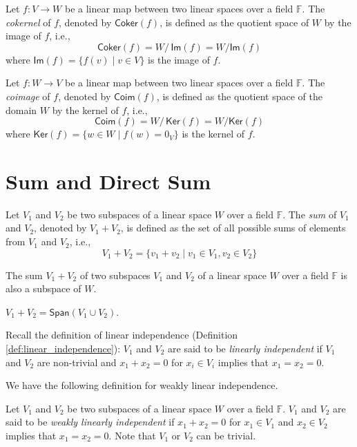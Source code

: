 \documentclass[
	11pt, %
	fleqn, %
	a4paper, %
]{LegrandOrangeBook}
\renewcommand{\ker}[1]{\mathsf{Ker}(#1)} %
\renewcommand{\Im}[1]{\mathsf{Im}(#1)} %
\renewcommand{\span}[1]{\mathsf{Span}(#1)} %
\newcommand{\quotient}[2]{#1/\, #2} %
\newcommand{\F}{\mathbb{F}} %
\newcommand{\coker}[1]{\mathsf{Coker}(#1)} %
\newcommand{\coim}[1]{\mathsf{Coim}(#1)} %
\begin{document}
\begin{definition}[Cokernel]
    Let $f : V \to W$ be a linear map between two linear spaces over a field $\F$. The \emph{cokernel} of $f$, denoted by $\coker{f}$, is defined as the quotient space of $W$ by the image of $f$, i.e., 
    \[
        \coker{f} = \quotient{W}{\Im{f}} = W / \Im{f}
    \]
    where $\Im{f} = \{ f(v) \mid v \in V \}$ is the image of $f$.
\end{definition}

\begin{definition}[Coimage]
    Let $f : W \to V$ be a linear map between two linear spaces over a field $\F$. The \emph{coimage} of $f$, denoted by $\coim{f}$, is defined as the quotient space of the domain $W$ by the kernel of $f$, i.e.,
    \[
        \coim{f} = \quotient{W}{\ker{f}} = W / \ker{f}
    \]
    where $\ker{f} = \{ w \in W \mid f(w) = 0_V \}$ is the kernel of $f$.
\end{definition}

\newpage

\section{Sum and Direct Sum}

\begin{definition}
    Let $V_1$ and $V_2$ be two subspaces of a linear space $W$ over a field $\F$. The \emph{sum} of $V_1$ and $V_2$, denoted by $V_1 + V_2$, is defined as the set of all possible sums of elements from $V_1$ and $V_2$, i.e.,
    \[
        V_1 + V_2 = \{ v_1 + v_2 \mid v_1 \in V_1, v_2 \in V_2 \}
    \]
\end{definition}

\begin{proposition}
    The sum $V_1 + V_2$ of two subspaces $V_1$ and $V_2$ of a linear space $W$ over a field $\F$ is also a subspace of $W$.
\end{proposition}

\begin{proposition}
    $V_1 + V_2 = \span{V_1 \cup V_2}$.
\end{proposition}

Recall the definition of linear independence (Definition \ref{def:linear_independence}): $V_1$ and $V_2$ are said to be \emph{linearly independent} if $V_1$ and $V_2$ are non-trivial and $x_1 + x_2 = 0$ for $x_i \in V_i$ implies that $x_1 = x_2 = 0$.

We have the following definition for weakly linear independence.
\begin{definition}
    Let $V_1$ and $V_2$ be two subspaces of a linear space $W$ over a field $\F$. $V_1$ and $V_2$ are said to be \emph{weakly linearly independent} if $x_1 + x_2 = 0$ for $x_1 \in V_1$ and $x_2 \in V_2$ implies that $x_1 = x_2 = 0$. Note that $V_1$ or $V_2$ can be trivial.
\end{definition}
\end{document}
